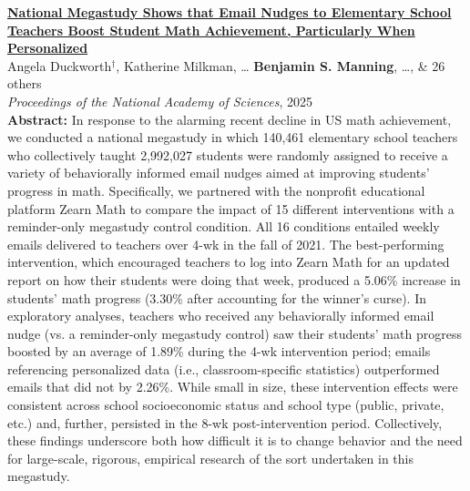 \documentclass[11pt]{article}
\newenvironment{publist}
  {\begin{list}{}{%
    \setlength{\leftmargin}{1.5em}%
    \setlength{\itemindent}{-1.5em}%
    \setlength{\itemsep}{10pt}%
    \setlength{\parsep}{0pt}%
    \setlength{\topsep}{4pt}}}
  {\end{list}}
\begin{document}
\begin{publist}
\item \href{https://www.pnas.org/doi/10.1073/pnas.2418616122}{\textbf{National Megastudy Shows that Email Nudges to Elementary School Teachers Boost Student Math Achievement, Particularly When Personalized}}\\
Angela Duckworth$^\dagger$, Katherine Milkman, \ldots{} \textbf{Benjamin S. Manning}, \ldots, \& 26 others\\
\textit{Proceedings of the National Academy of Sciences}, 2025\\[3pt]
{\footnotesize \textbf{Abstract: }In response to the alarming recent decline in US math achievement, we conducted a national megastudy in which 140,461 elementary school teachers who collectively taught 2,992,027 students were randomly assigned to receive a variety of behaviorally informed email nudges aimed at improving students' progress in math. Specifically, we partnered with the nonprofit educational platform Zearn Math to compare the impact of 15 different interventions with a reminder-only megastudy control condition. All 16 conditions entailed weekly emails delivered to teachers over 4-wk in the fall of 2021. The best-performing intervention, which encouraged teachers to log into Zearn Math for an updated report on how their students were doing that week, produced a 5.06\% increase in students' math progress (3.30\% after accounting for the winner's curse). In exploratory analyses, teachers who received any behaviorally informed email nudge (vs. a reminder-only megastudy control) saw their students' math progress boosted by an average of 1.89\% during the 4-wk intervention period; emails referencing personalized data (i.e., classroom-specific statistics) outperformed emails that did not by 2.26\%. While small in size, these intervention effects were consistent across school socioeconomic status and school type (public, private, etc.) and, further, persisted in the 8-wk post-intervention period. Collectively, these findings underscore both how difficult it is to change behavior and the need for large-scale, rigorous, empirical research of the sort undertaken in this megastudy.}


\end{publist}
\end{document}
